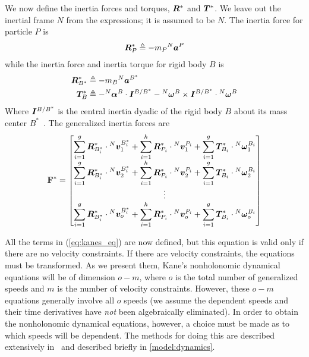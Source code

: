 We now define the inertia forces and torques, $\boldsymbol{R}^*$ and $\boldsymbol{T}^*$. We
leave out the inertial frame $N$ from the expressions; it is assumed to be $N$.
The inertia force for particle $P$ is
\begin{align}
\label{eq:particle_gen_inertia}
\boldsymbol{R}^*_P \triangleq -m_P {^N}\boldsymbol{a}^P
\end{align}
while the inertia force and inertia torque for rigid body $B$ is
\begin{align}
\label{eq:rb_translational_gen_inertia}
\boldsymbol{R}^*_{B^*} &\triangleq -m_B {^N}\boldsymbol{a}^{B^*} \\
\label{eq:rb_rotational_gen_inertia}
\boldsymbol{T}^*_B &\triangleq -{^N}\boldsymbol{\alpha}^B \cdot \boldsymbol{I}^{B/B^*} -
{^N}\boldsymbol{\omega}^B \times \boldsymbol{I}^{B/B^*} \cdot {^N}\boldsymbol{\omega}^B
\end{align}
Where $\boldsymbol{I}^{B/B^*}$ is the central inertia dyadic of the rigid body
$B$ about its mass center $B^*$~\cite{Kane1985}. The generalized inertia forces
are
\begin{equation}
\label{eq:definition_Fstar}
\mathbf{F}^* =
\begin{bmatrix}
\displaystyle \sum_{i=1}^g \boldsymbol{R}^*_{B^*_i} \cdot {^N}\boldsymbol{v}^{B^*_i}_1 +
\sum_{i=1}^h \boldsymbol{R}^*_{P_i} \cdot {^N}\boldsymbol{v}^{P_i}_1 +
\sum_{i=1}^g \boldsymbol{T}^*_{B_i} \cdot {^N}\boldsymbol{\omega}^{B_i}_1 \\
\displaystyle \sum_{i=1}^g \boldsymbol{R}^*_{B^*_i} \cdot {^N}\boldsymbol{v}^{B^*_i}_2 +
\sum_{i=1}^h \boldsymbol{R}^*_{P_i} \cdot {^N}\boldsymbol{v}^{P_i}_2 +
\sum_{i=1}^g \boldsymbol{T}^*_{B_i} \cdot {^N}\boldsymbol{\omega}^{B_i}_2 \\
\displaystyle \vdots \\
\displaystyle \sum_{i=1}^g \boldsymbol{R}^*_{B^*_i} \cdot {^N}\boldsymbol{v}^{B^*_i}_o +
\sum_{i=1}^h \boldsymbol{R}^*_{P_i} \cdot {^N}\boldsymbol{v}^{P_i}_o +
\sum_{i=1}^g \boldsymbol{T}^*_{B_i} \cdot {^N}\boldsymbol{\omega}^{B_i}_o
\end{bmatrix}
\end{equation}

All the terms in (\ref{eq:kanes_eq}) are now defined, but this equation is
valid only if there are no velocity constraints. If there are velocity
constraints, the equations must be transformed. As we present them, Kane's
nonholonomic dynamical equations will be of dimension $o - m$, where $o$ is the
total number of generalized speeds and $m$ is the number of velocity
constraints. However, these $o-m$ equations generally involve all $o$ speeds
(we assume the dependent speeds and their time derivatives have \textit{not}
been algebraically eliminated). In order to obtain the nonholonomic dynamical
equations, however, a choice must be made as to which speeds will be dependent.
The methods for doing this are described extensively in~\cite{Reckdahl1996} and
described briefly in \autoref{model:dynamics}.

